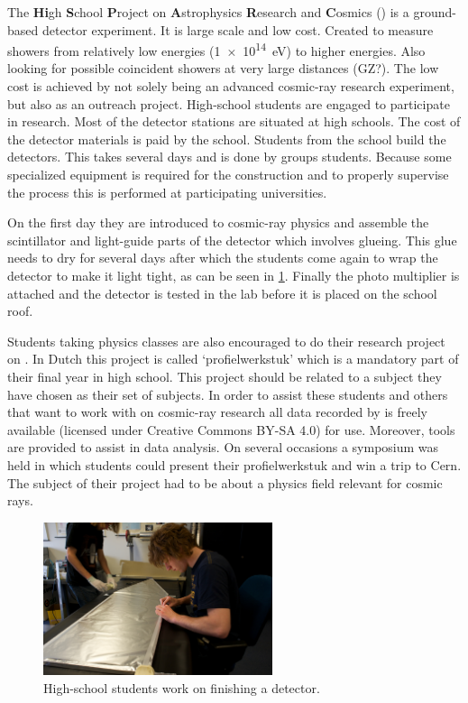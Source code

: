 The \textbf{Hi}gh \textbf{S}chool \textbf{P}roject on \textbf{A}strophysics \textbf{R}esearch and \textbf{C}osmics (\hisparc) is a ground-based detector experiment. It is large scale and low cost. Created to measure showers from relatively low energies (\SI{1e14}{\electronvolt}) to higher energies. Also looking for possible coincident showers at very large distances (GZ?). The low cost is achieved by not solely being an advanced cosmic-ray research experiment, but also as an outreach project. High-school students are engaged to participate in research. Most of the \hisparc detector stations are situated at high schools. The cost of the detector materials is paid by the school. Students from the school build the detectors. This takes several days and is done by groups students. Because some specialized equipment is required for the construction and to properly supervise the process this is performed at participating universities.

On the first day they are introduced to cosmic-ray physics and assemble the scintillator and light-guide parts of the detector which involves glueing. This glue needs to dry for several days after which the students come again to wrap the detector to make it light tight, as can be seen in \cref{fig:detector-bouw}. Finally the photo multiplier is attached and the detector is tested in the lab before it is placed on the school roof.

Students taking physics classes are also encouraged to do their research project on \hisparc. In Dutch this project is called `profielwerkstuk' which is a mandatory part of their final year in high school. This project should be related to a subject they have chosen as their set of subjects. In order to assist these students and others that want to work with on cosmic-ray research all data recorded by \hisparc is freely available (licensed under Creative Commons BY-SA 4.0) for use. Moreover, tools are provided to assist in data analysis. On several occasions a symposium was held in which students could present their profielwerkstuk and win a trip to Cern. The subject of their project had to be about a physics field relevant for cosmic rays.

\begin{figure}
    \centering
    \includegraphics[width=0.6\textwidth]
                    {plots/cosmic-rays/ADL_100352}
    \caption{High-school students work on finishing a detector.}
    \label{fig:detector-bouw}
\end{figure}


